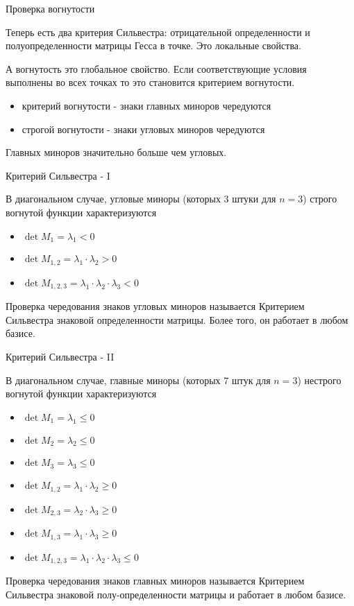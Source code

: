 \documentclass{beamer}
\begin{document}
\begin{frame}{Проверка вогнутости}

Теперь есть два критерия Сильвестра: отрицательной определенности и полуопределенности матрицы Гесса в точке. Это локальные свойства. 

А вогнутость это глобальное свойство. Если соответствующие условия выполнены во всех точках то это становится критерием вогнутости.
\begin{itemize}
\item критерий вогнутости - знаки \alert{главных миноров} чередуются
\item строгой вогнутости - знаки \alert{угловых миноров} чередуются
\end{itemize}

Главных миноров значительно больше чем угловых.

\end{frame}

\begin{frame}{Критерий Сильвестра - I}

В диагональном случае, угловые миноры (которых 3 штуки для $n = 3$) строго вогнутой функции характеризуются

\begin{itemize}
  \item $\det M_{1} = \lambda_1 < 0$
  \item $\det M_{1,2} = \lambda_1 \cdot \lambda_2 > 0$
  \item $\det M_{1,2,3} = \lambda_1 \cdot \lambda_2 \cdot \lambda_3 < 0$
\end{itemize}

Проверка чередования знаков угловых миноров называется \alert{Критерием Сильвестра знаковой определенности матрицы}. Более того, он работает в любом базисе.

\end{frame}

\begin{frame}{Критерий Сильвестра - II}

В диагональном случае, главные миноры (которых 7 штук для $n = 3$) нестрого вогнутой функции характеризуются

\begin{itemize}
  \item $\det M_{1} = \lambda_1 \leqslant 0$
  \item $\det M_{2} = \lambda_2 \leqslant 0$
  \item $\det M_{3} = \lambda_3 \leqslant 0$
  \item $\det M_{1,2} = \lambda_1 \cdot \lambda_2 \geqslant 0$
  \item $\det M_{2,3} = \lambda_2 \cdot \lambda_3 \geqslant 0$
  \item $\det M_{1,3} = \lambda_1 \cdot \lambda_3 \geqslant 0$
  \item $\det M_{1,2,3} = \lambda_1 \cdot \lambda_2 \cdot \lambda_3 \leqslant 0$
\end{itemize}

Проверка чередования знаков главных миноров называется \alert{Критерием Сильвестра знаковой полу-определенности матрицы} и работает в любом базисе.

\end{frame}
\end{document}
